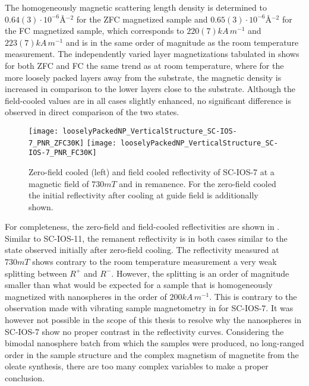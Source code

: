 \documentclass[\main/dresen_thesis.tex]{subfiles}
\begin{document}
  The homogeneously magnetic scattering length density is determined to $0.64(3) \cdot \unit{10^{-6} \angstrom^{-2}}$ for the ZFC magnetized sample and $0.65(3) \cdot \unit{10^{-6} \angstrom^{-2}}$ for the FC magnetized sample, which corresponds to $220(7) \unit{kA \, m^{-1}}$ and $223(7) \unit{kA \, m^{-1}}$ and is in the same order of magnitude as the room temperature measurement.
  The independently varied layer magnetizations tabulated in  shows for both ZFC and FC the same trend as at room temperature, where for the more loosely packed layers away from the substrate, the magnetic density is increased in comparison to the lower layers close to the substrate.
  Although the field-cooled values are in all cases slightly enhanced, no significant difference is observed in direct comparison of the two states.

  \begin{figure}[tb]
    \centering
    \texttt{[image: looselyPackedNP\_VerticalStructure\_SC-IOS-7\_PNR\_ZFC30K]}
    \texttt{[image: looselyPackedNP\_VerticalStructure\_SC-IOS-7\_PNR\_FC30K]}
    \caption{\label{fig:looselyPackedNP:layer:ZFCFCIOS7}Zero-field cooled (left) and field cooled reflectivity of SC-IOS-7 at a magnetic field of $730 \unit{mT}$ and in remanence. For the zero-field cooled the initial reflectivity after cooling at guide field is additionally shown.}
  \end{figure}

  For completeness, the zero-field and field-cooled reflectivities are shown in .
  Similar to SC-IOS-11, the remanent reflectivity is in both cases similar to the state observed initially after zero-field cooling.
  The reflectivity measured at $730 \unit{mT}$ shows contrary to the room temperature measurement a very weak splitting between $R^{+}$ and $R^{-}$.
  However, the splitting is an order of magnitude smaller than what would be expected for a sample that is homogeneously magnetized with nanospheres in the order of $200 \unit{kA \, m^{-1}}$.
  This is contrary to the observation made with vibrating sample magnetometry in  for SC-IOS-7.
  It was however not possible in the scope of this thesis to resolve why the nanospheres in SC-IOS-7 show no proper contrast in the reflectivity curves.
  Considering the bimodal nanosphere batch from which the samples were produced, no long-ranged order in the sample structure and the complex magnetism of magnetite from the oleate synthesis, there are too many complex variables to make a proper conclusion.
\end{document}
